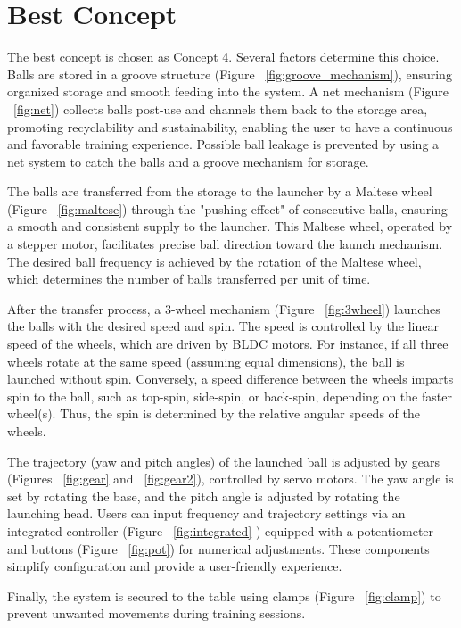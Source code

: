 \documentclass[12pt]{report}
\begin{document}
\section{Best Concept}

\begin{minipage}{0.7\textwidth}

The best concept is chosen as Concept 4. Several factors determine this choice. Balls are stored in a groove structure (Figure ~\ref{fig:groove_mechanism}), ensuring organized storage and smooth feeding into the system. A net mechanism (Figure ~\ref{fig:net}) collects balls post-use and channels them back to the storage area, promoting recyclability and sustainability, enabling the user to have a continuous and favorable training experience. Possible ball leakage is prevented by using a net system to catch the balls and a groove mechanism for storage.

The balls are transferred from the storage to the launcher by a Maltese wheel (Figure ~\ref{fig:maltese}) through the "pushing effect" of consecutive balls, ensuring a smooth and consistent supply to the launcher. This Maltese wheel, operated by a stepper motor, facilitates precise ball direction toward the launch mechanism. The desired ball frequency is achieved by the rotation of the Maltese wheel, which determines the number of balls transferred per unit of time.

After the transfer process, a 3-wheel mechanism (Figure ~\ref{fig:3wheel}) launches the balls with the desired speed and spin. The speed is controlled by the linear speed of the wheels, which are driven by BLDC motors. For instance, if all three wheels rotate at the same speed (assuming equal dimensions), the ball is launched without spin. Conversely, a speed difference between the wheels imparts spin to the ball, such as top-spin, side-spin, or back-spin, depending on the faster wheel(s). Thus, the spin is determined by the relative angular speeds of the wheels.

The trajectory (yaw and pitch angles) of the launched ball is adjusted by gears (Figures ~\ref{fig:gear} and ~\ref{fig:gear2}), controlled by servo motors. The yaw angle is set by rotating the base, and the pitch angle is adjusted by rotating the launching head. Users can input frequency and trajectory settings via an integrated controller (Figure ~\ref{fig:integrated} ) equipped with a potentiometer and buttons (Figure ~\ref{fig:pot}) for numerical adjustments. These components simplify configuration and provide a user-friendly experience.

Finally, the system is secured to the table using clamps (Figure ~\ref{fig:clamp}) to prevent unwanted movements during training sessions.
\end{minipage}%
\end{document}
